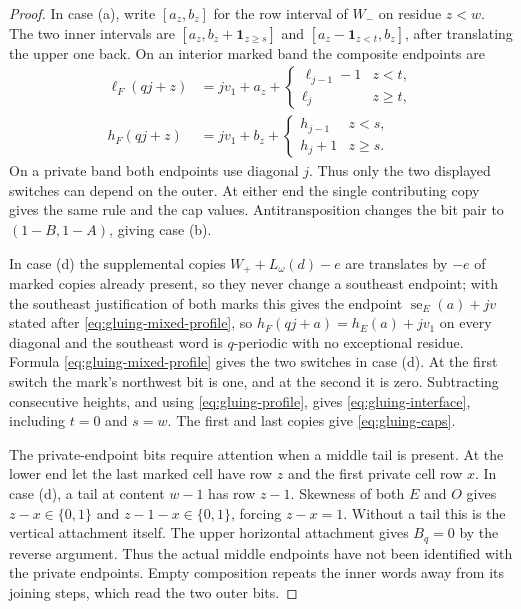 \documentclass[11pt,a4paper]{amsart}
\numberwithin{equation}{section}
\theoremstyle{plain}
\theoremstyle{definition}
\begin{document}
\begin{proof}
In case (a), write \([a_z,b_z]\) for the row interval of \(W_-\) on residue \(z<w\).  The two inner intervals are \([a_z,b_z+\mathbf1_{z\ge s}]\) and \([a_z-\mathbf1_{z<t},b_z]\), after translating the upper one back.  On an interior marked band the composite endpoints are
\begin{equation}\label{eq:gluing-ordinary-endpoints}
 \begin{split}
 \ell_F(qj+z)&=jv_1+a_z+
  \begin{cases}\ell_{j-1}-1&z<t,\\\ell_j&z\ge t,\end{cases}\\
 h_F(qj+z)&=jv_1+b_z+
  \begin{cases}h_{j-1}&z<s,\\h_j+1&z\ge s.\end{cases}
 \end{split}
\end{equation}
On a private band both endpoints use diagonal \(j\).  Thus only the two displayed switches can depend on the outer.  At either end the single contributing copy gives the same rule and the cap values.  Antitransposition changes the bit pair to \((1-B,1-A)\), giving case (b).

In case (d) the supplemental copies \(W_++L_\omega(d)-e\) are translates by \(-e\) of marked copies already present, so they never change a southeast endpoint; with the southeast justification of both marks this gives the endpoint \(\operatorname{se}_E(a)+jv\) stated after \eqref{eq:gluing-mixed-profile}, so \(h_F(qj+a)=h_E(a)+jv_1\) on every diagonal and the southeast word is \(q\)-periodic with no exceptional residue.  Formula \eqref{eq:gluing-mixed-profile} gives the two switches in case (d).  At the first switch the mark's northwest bit is one, and at the second it is zero.  Subtracting consecutive heights, and using \eqref{eq:gluing-profile}, gives \eqref{eq:gluing-interface}, including \(t=0\) and \(s=w\).  The first and last copies give \eqref{eq:gluing-caps}.

The private-endpoint bits require attention when a middle tail is present.  At the lower end let the last marked cell have row \(z\) and the first private cell row \(x\).  In case (d), a tail at content \(w-1\) has row \(z-1\).  Skewness of both \(E\) and \(O\) gives \(z-x\in\{0,1\}\) and \(z-1-x\in\{0,1\}\), forcing \(z-x=1\).  Without a tail this is the vertical attachment itself.  The upper horizontal attachment gives \(B_q=0\) by the reverse argument.  Thus the actual middle endpoints have not been identified with the private endpoints.  Empty composition repeats the inner words away from its joining steps, which read the two outer bits.
\end{proof}
\end{document}
